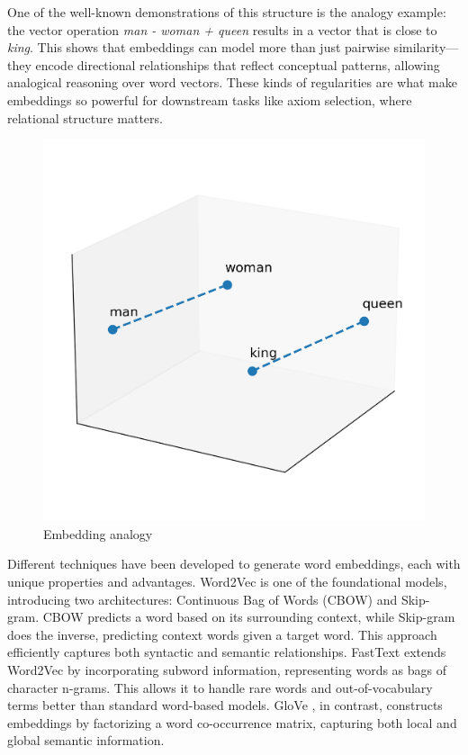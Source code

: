 \documentclass[english,version-2020-11]{uzl-thesis}
\begin{document}
One of the well-known demonstrations of this structure is the analogy example: the vector operation \textit{man - woman + queen} results in a vector that is close to \textit{king}. This shows that embeddings can model more than just pairwise similarity—they encode directional relationships that reflect conceptual patterns, allowing analogical reasoning over word vectors. These kinds of regularities are what make embeddings so powerful for downstream tasks like axiom selection, where relational structure matters. \cite{Mikolov2013}

\begin{figure}[h!]
    \centering
    \includegraphics[width=\textwidth]{embedding_analogy.png}
    \caption{Embedding analogy}
    \label{fig:embedding_analogy}
\end{figure}
\FloatBarrier

Different techniques have been developed to generate word embeddings, each with unique properties and advantages. Word2Vec \cite{Mikolov2013} is one of the foundational models, introducing two architectures: Continuous Bag of Words (CBOW) and Skip-gram. CBOW predicts a word based on its surrounding context, while Skip-gram does the inverse, predicting context words given a target word. This approach efficiently captures both syntactic and semantic relationships. FastText \cite{Bojanowski2017} extends Word2Vec by incorporating subword information, representing words as bags of character n-grams. This allows it to handle rare words and out-of-vocabulary terms better than standard word-based models. GloVe \cite{Pennington2014}, in contrast, constructs embeddings by factorizing a word co-occurrence matrix, capturing both local and global semantic information.
\end{document}
